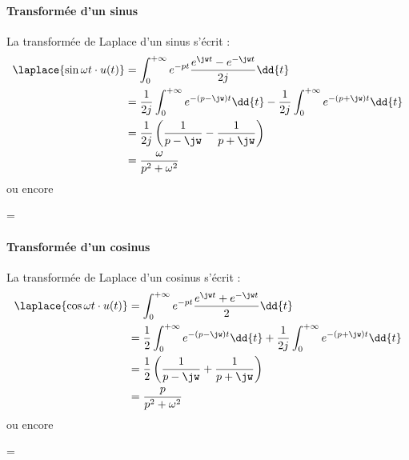 \paragraph{Transformée d'un sinus}
La transformée de Laplace d'un sinus s'écrit :
\begin{align*}
\laplace{\sin{\omega t}\cdot u(t)}&=
\int_{0}^{+\infty}e^{-pt}\dfrac{e^{\jw t}-e^{-\jw t}}{2j}\dd{t}\\
&=\dfrac{1}{2j}\int_{0}^{+\infty}e^{-(p-\jw)t}\dd{t} - 
  \dfrac{1}{2j}\int_{0}^{+\infty}e^{-(p+\jw)t}\dd{t} \\
&=\dfrac{1}{2j}\left( \dfrac{1}{p-\jw}-\dfrac{1}{p+\jw}\right)\\
&=\dfrac{\omega}{p^2+\omega^2}
\end{align*}
ou encore
\begin{bequation}
    =
\end{bequation}
\paragraph{Transformée d'un cosinus}
La transformée de Laplace d'un cosinus s'écrit :
\begin{align*}
\laplace{\cos{\omega t}\cdot u(t)}&=\int_{0}^{+\infty}e^{-pt}
\dfrac{e^{\jw t}+e^{-\jw t}}{2}\dd{t}\\
&=\dfrac{1}{2}\int_{0}^{+\infty}e^{-(p-\jw)t}\dd{t} + 
\dfrac{1}{2j}\int_{0}^{+\infty}e^{-(p+\jw)t}\dd{t} \\
&=\dfrac{1}{2}\left( \dfrac{1}{p-\jw}+\dfrac{1}{p+\jw}\right)\\
&=\dfrac{p}{p^2+\omega^2}
\end{align*}
ou encore
\begin{bequation}
    =
\end{bequation}
\newpage
{}
